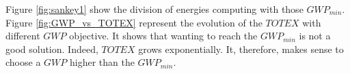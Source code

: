 \documentclass[12pt, a4paper ]{article}
\begin{document}
Figure \ref{fig:sankey1} show the division of energies computing with those $GWP_{min}$.
Figure \ref{fig:GWP_vs_TOTEX} represent the evolution of the $TOTEX$ with different $GWP$ objective. It shows that wanting to reach the $GWP_{min}$ is not a good solution. Indeed, $TOTEX$ grows exponentially.
It, therefore, makes sense to choose a $GWP$ higher than the $GWP_{min}$.
\end{document}
